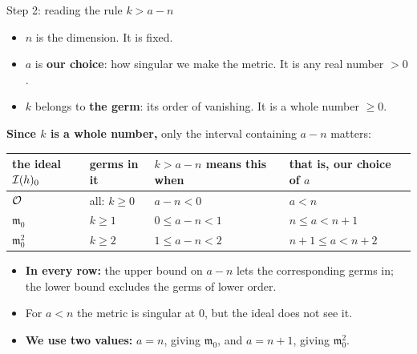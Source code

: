 \begin{frame}{Step 2: reading the rule \(k>a-n\)}
\label{fr:mi-reading}
\label{fr:mi-ideals}
\begin{itemize}
\item \(n\) is the dimension. It is fixed.
\item \(a\) is \textbf{our choice}: how singular we make the metric. It is any real number \(>0\).
\item \(k\) belongs to \textbf{the germ}: its order of vanishing. It is a whole number \(\ge0\).
\end{itemize}
\textbf{Since \(k\) is a whole number,} only the interval containing \(a-n\) matters:
\begin{center}
\renewcommand{\arraystretch}{1.0}
\begin{tabular}{@{}llll@{}}
\hline
the ideal \(\mathcal I(h)_0\) & germs in it & \(k>a-n\) means this when & that is, our choice of \(a\)\\
\hline
\(\mathcal O\) & all: \(k\ge0\) & \(a-n<0\) & \(a<n\)\\
\(\mathfrak m_0\) & \(k\ge1\) & \(0\le a-n<1\) & \(n\le a<n+1\)\\
\(\mathfrak m_0^2\) & \(k\ge2\) & \(1\le a-n<2\) & \(n+1\le a<n+2\)\\
\hline
\end{tabular}
\end{center}
\begin{itemize}
\item \textbf{In every row:} the upper bound on \(a-n\) lets the corresponding germs in; the lower bound excludes the germs of lower order.
\item For \(a<n\) the metric is singular at \(0\), but the ideal does not see it.
\item \textbf{We use two values:} \(a=n\), giving \(\mathfrak m_0\), and \(a=n+1\), giving \(\mathfrak m_0^2\).
\end{itemize}
\end{frame}




